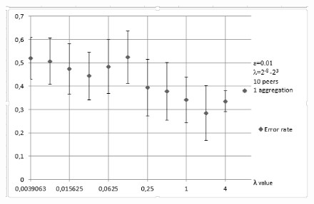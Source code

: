 \begin{figure}[H]
	\begin{minipage}{.68\linewidth}
		\includegraphics[width=\linewidth]{fig/spambase/regularization_lowepsilon}
		\label{fig:regularization_lowepsilon}
	\end{minipage}
\end{figure}


